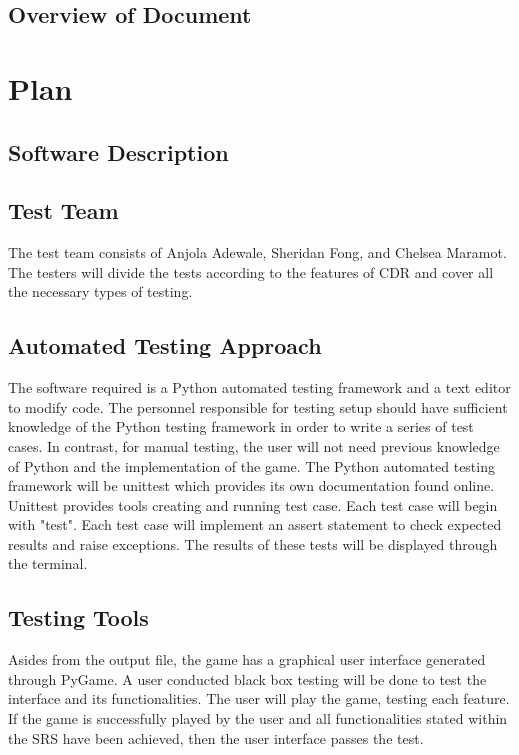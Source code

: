 \documentclass[12pt, titlepage]{article}
\begin{document}
\subsection{Overview of Document}

\section{Plan}
	
\subsection{Software Description}

\subsection{Test Team}

The test team consists of Anjola Adewale, Sheridan Fong, and Chelsea Maramot. The testers will divide the tests according to the features of CDR and cover all the necessary types of testing.

\subsection{Automated Testing Approach}

The software required is a Python automated testing framework and a text editor to modify code. The personnel responsible for testing setup should have sufficient knowledge of the Python testing framework in order to write a series of test cases. In contrast, for manual testing, the user will not need previous knowledge of Python and the implementation of the game. The Python automated testing framework will be unittest which provides its own documentation found online. Unittest provides tools creating and running test case. Each test case will begin with "test". Each test case will implement an assert statement to check expected results and raise exceptions. The results of these tests will be displayed through the terminal.


\subsection{Testing Tools}

Asides from the output file, the game has a graphical user interface generated through PyGame. A user conducted black box testing will be done to test the interface and its functionalities. The user will play the game, testing each feature. If the game is successfully played by the user and all functionalities stated within the SRS have been achieved, then the user interface passes the test.
\end{document}
